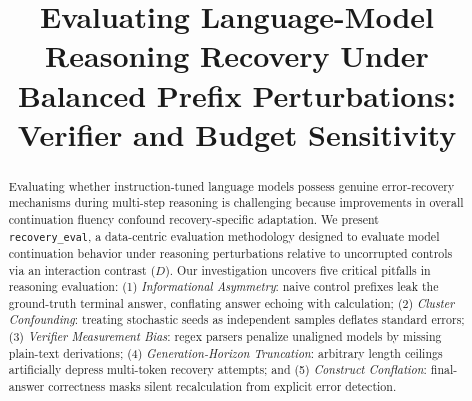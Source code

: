 \documentclass[conference]{IEEEtran}
\begin{document}
\setlength{\textfloatsep}{5pt plus 1pt minus 1pt}
\setlength{\floatsep}{5pt plus 1pt minus 1pt}
\setlength{\intextsep}{5pt plus 1pt minus 1pt}

\title{Evaluating Language-Model Reasoning Recovery Under Balanced Prefix Perturbations: Verifier and Budget Sensitivity}

\author{
}

\maketitle

\begin{abstract}
Evaluating whether instruction-tuned language models possess genuine error-recovery mechanisms during multi-step reasoning is challenging because improvements in overall continuation fluency confound recovery-specific adaptation. We present \texttt{recovery\_eval}, a data-centric evaluation methodology designed to evaluate model continuation behavior under reasoning perturbations relative to uncorrupted controls via an interaction contrast ($D$). Our investigation uncovers five critical pitfalls in reasoning evaluation: (1) \textit{Informational Asymmetry}: naive control prefixes leak the ground-truth terminal answer, conflating answer echoing with calculation; (2) \textit{Cluster Confounding}: treating stochastic seeds as independent samples deflates standard errors; (3) \textit{Verifier Measurement Bias}: regex parsers penalize unaligned models by missing plain-text derivations; (4) \textit{Generation-Horizon Truncation}: arbitrary length ceilings artificially depress multi-token recovery attempts; and (5) \textit{Construct Conflation}: final-answer correctness masks silent recalculation from explicit error detection.

\end{abstract}
\end{document}
